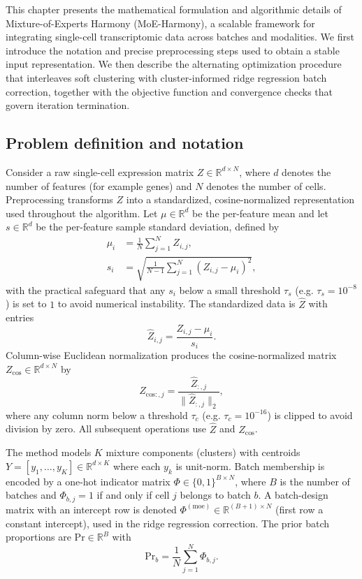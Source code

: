 \documentclass{article}
\begin{document}
This chapter presents the mathematical formulation and algorithmic details of Mixture-of-Experts Harmony (MoE-Harmony), a scalable framework for integrating single-cell transcriptomic data across batches and modalities. We first introduce the notation and precise preprocessing steps used to obtain a stable input representation. We then describe the alternating optimization procedure that interleaves soft clustering with cluster-informed ridge regression batch correction, together with the objective function and convergence checks that govern iteration termination.

\subsection{Problem definition and notation}

Consider a raw single-cell expression matrix $Z \in \mathbb{R}^{d \times N}$, where $d$ denotes the number of features (for example genes) and $N$ denotes the number of cells. Preprocessing transforms $Z$ into a standardized, cosine-normalized representation used throughout the algorithm. Let $\mu \in \mathbb{R}^d$ be the per-feature mean and let $s \in \mathbb{R}^d$ be the per-feature sample standard deviation, defined by
\begin{align}
    \mu_i &= \frac{1}{N} \sum_{j=1}^N Z_{i,j}, \\
    s_i &= \sqrt{ \frac{1}{N-1} \sum_{j=1}^N (Z_{i,j} - \mu_i)^2 },
\end{align}
with the practical safeguard that any $s_i$ below a small threshold $\tau_s$ (e.g. $\tau_s = 10^{-8}$) is set to $1$ to avoid numerical instability. The standardized data is $\hat{Z}$ with entries
\begin{equation}
    \hat{Z}_{i,j} = \frac{Z_{i,j} - \mu_i}{s_i}.
\end{equation}
Column-wise Euclidean normalization produces the cosine-normalized matrix $Z_{\mathrm{cos}} \in \mathbb{R}^{d \times N}$ by
\begin{equation}
    Z_{\mathrm{cos}:,j} = \frac{\hat{Z}_{:,j}}{\|\hat{Z}_{:,j}\|_2},
\end{equation}
where any column norm below a threshold $\tau_c$ (e.g. $\tau_c = 10^{-16}$) is clipped to avoid division by zero. All subsequent operations use $\hat{Z}$ and $Z_{\mathrm{cos}}$.

The method models $K$ mixture components (clusters) with centroids $Y = [y_1, \dots, y_K] \in \mathbb{R}^{d \times K}$ where each $y_k$ is unit-norm. Batch membership is encoded by a one-hot indicator matrix $\Phi \in \{0,1\}^{B \times N}$, where $B$ is the number of batches and $\Phi_{b,j}=1$ if and only if cell $j$ belongs to batch $b$. A batch-design matrix with an intercept row is denoted $\Phi^{(\mathrm{moe})} \in \mathbb{R}^{(B+1) \times N}$ (first row a constant intercept), used in the ridge regression correction. The prior batch proportions are $\mathrm{Pr} \in \mathbb{R}^B$ with
\begin{equation}
    \mathrm{Pr}_b = \frac{1}{N} \sum_{j=1}^N \Phi_{b,j}.
\end{equation}
\end{document}
